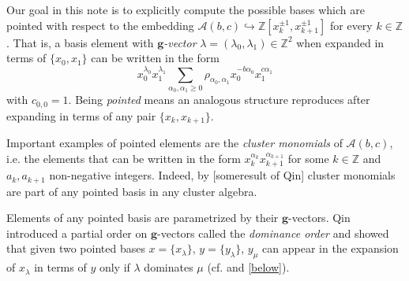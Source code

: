 \documentclass{amsart}
\numberwithin{theorem}{section}
\newcommand{\bfg}{\boldsymbol{g}}
\newcommand{\cA}{\mathcal{A}}
\newcommand{\ZZ}{\mathbb{Z}}
\newcommand{\into}{\hookrightarrow}
\begin{document}
  Our goal in this note is to explicitly compute the possible bases which are pointed with respect to the embedding $\cA(b,c)\into\ZZ[x_k^{\pm1},x_{k+1}^{\pm1}]$ for every $k\in\ZZ$.
  That is, a basis element with \emph{$\bfg$-vector} $\lambda=(\lambda_0,\lambda_1)\in\ZZ^2$ when expanded in terms of $\{x_0,x_1\}$ can be written in the form
  \begin{equation}
    \label{eq:pointed}
    x_0^{\lambda_0}x_1^{\lambda_1}\sum\limits_{\alpha_0,\alpha_1 \ge 0} \rho_{\alpha_0,\alpha_1} x_0^{-b\alpha_0} x_1^{c\alpha_1}
  \end{equation}
  with $c_{0,0}=1$.
  Being \emph{pointed} means an analogous structure reproduces after expanding in terms of any pair $\{x_k,x_{k+1}\}$.

  Important examples of pointed elements are the \emph{cluster monomials} of $\cA(b,c)$, i.e. the elements that can be written in the form $x_k^{\alpha_k}x_{k+1}^{\alpha_{k+1}}$ for some $k\in\ZZ$ and $a_k,a_{k+1}$ non-negative integers.
  Indeed, by [someresult of Qin] cluster monomials are part of any pointed basis in any cluster algebra.

  Elements of any pointed basis are parametrized by their $\bfg$-vectors.
  Qin introduced a partial order on $\bfg$-vectors called the \emph{dominance order} and showed that given two pointed bases $x=\{x_\lambda\}$, $y=\{y_\lambda\}$, $y_\mu$ can appear in the expansion of $x_\lambda$ in terms of $y$ only if $\lambda$ dominates $\mu$ (cf. \cite[Mainthm]{Qin} and \ref{below}).
\end{document}
